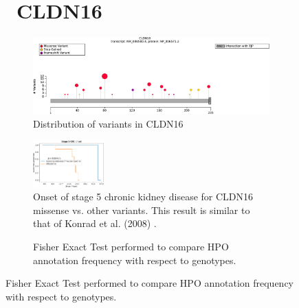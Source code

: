\begin{figure}[htbp]
\section*{ CLDN16}
\centering
\begin{subfigure}[b]{0.95\textwidth}
\centering
\includegraphics[width=\textwidth]{ img/CLDN16_protein_diagram.pdf} 
\captionsetup{justification=raggedright,singlelinecheck=false}
\caption{Distribution of variants in CLDN16}
\end{subfigure}

\vspace{2em}

\begin{subfigure}[b]{0.95\textwidth}
\centering
\includegraphics[width=0.3\textwidth]{ img/CLDN16_stats.pdf} 
\captionsetup{justification=raggedright,singlelinecheck=false}
\caption{Onset of stage 5 chronic kidney disease for CLDN16 missense vs. other variants. This result is similar to that of Konrad et al. (2008) \cite{PMID_18003771}.}
\end{subfigure}

\vspace{2em}

\begin{subfigure}[b]{0.95\textwidth}
\centering
{}
\captionsetup{justification=raggedright,singlelinecheck=false}
\caption{Fisher Exact Test performed to compare HPO annotation frequency with respect to genotypes.}
\end{subfigure}


\end{figure}
